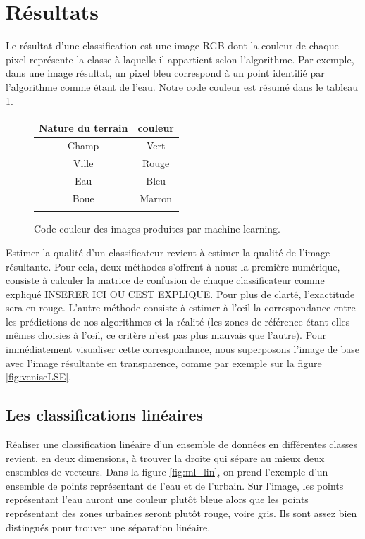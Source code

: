 \documentclass[a4paper,10pt]{article}
\begin{document}
\section{Résultats}
Le résultat d'une classification est une image RGB dont la couleur de chaque pixel représente la classe à laquelle il appartient selon l'algorithme. Par exemple, dans une image résultat, un pixel bleu correspond à un point identifié par l'algorithme comme étant de l'eau. Notre code couleur est résumé dans le tableau \ref{table:codeCouleur}.
\begin{figure}[H]
 \begin{center}
  \begin{tabular}{|c|c|}
    \hline
    Nature du terrain & couleur \\
    \hline
  Champ & Vert \\
  Ville &  Rouge \\
  Eau &  Bleu \\
  Boue & Marron \\
    \hline
  \label{table:codeCouleur}
  \end{tabular}
\caption{Code couleur des images produites par machine learning.} 
\end{center}
\end{figure}
Estimer la qualité d'un classificateur revient à estimer la qualité de l'image résultante. Pour cela, deux méthodes s'offrent à nous: la première numérique, consiste à calculer la matrice de confusion de chaque classificateur comme expliqué INSERER ICI OU CEST EXPLIQUE. Pour plus de clarté, l'exactitude sera en rouge. L'autre méthode consiste à estimer à l'œil la correspondance entre les prédictions de nos algorithmes et la réalité (les zones de référence étant elles-mêmes choisies à l'œil, ce critère n'est pas plus mauvais que l'autre). Pour immédiatement visualiser cette correspondance, nous superposons l'image de base avec l'image résultante en transparence, comme par exemple sur la figure \ref{fig:veniseLSE}.

 \subsection{Les classifications linéaires}
 
 Réaliser une classification linéaire d'un ensemble de données en différentes classes revient, en deux dimensions, à trouver la droite qui sépare au mieux deux ensembles de vecteurs. Dans la figure \ref{fig:ml_lin}, on prend l'exemple d'un ensemble de points représentant de l'eau et de l'urbain. Sur l'image, les points représentant l'eau auront une couleur plutôt bleue alors que les points représentant des zones urbaines seront plutôt rouge, voire gris. Ils sont assez bien distingués pour trouver une séparation linéaire.
\end{document}
